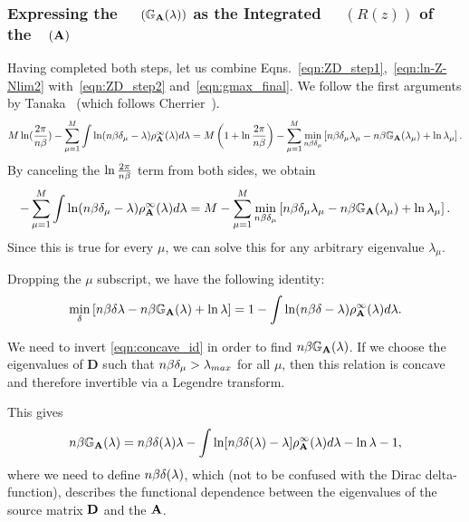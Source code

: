 \subsubsection{Expressing the~\GEN~
\texorpdfstring{$(\mathbb{G}_{\mathbf{A}}(\lambda))$}{GA(lambda)} as the Integrated~\RTransform~
\texorpdfstring{$(R(z))$}{R(z)} of the~\CorrelationMatrix~\texorpdfstring{$(\mathbf{A})$}{A}}
\label{sxn:tanaka_step3}
Having completed both steps, let us combine Eqns.~\ref{eqn:ZD_step1},~\ref{eqn:ln-Z-Nlim2}
with~\ref{eqn:ZD_step2} and~\ref{eqn:gmax_final}.
We follow the first arguments by Tanaka~\cite{Tanaka2007} (which follows Cherrier~\cite{Cherrier2003}).
\begin{align}
   M\ln(\dfrac{{2}\pi}{n\beta})-\sum_{\mu=1}^{M}\int \ln(n\beta\delta_{\mu}-\lambda)\rho^{\infty}_{\mathbf{A}}(\lambda)d\lambda
      = M \left( 1 + \ln \frac{2\pi}{n\beta} \right) - \sum_{\mu=1}^{M} \min_{n\beta\delta_{\mu}} \left[n\beta\delta_{\mu}\lambda_{\mu}
      - n\beta\mathbb{G}_{\mathbf{A}}(\lambda_{\mu}) + \ln \lambda_{\mu} \right]   .
\end{align}
By canceling the $\ln \frac{2\pi}{n\beta}$ term from both sides, we obtain
\begin{align}
   -\sum_{\mu=1}^{M}\int \ln(n\beta\delta_{\mu}-\lambda)\rho^{\infty}_{\mathbf{A}}(\lambda)d\lambda
   =
   M - \sum_{\mu=1}^{M} \min_{n\beta\delta_{\mu}} \left[n\beta\delta_{\mu}\lambda_{\mu}
   - n\beta\mathbb{G}_{\mathbf{A}}(\lambda_{\mu}) + \ln \lambda_{\mu} \right]   .
\end{align}
Since this is true for every $\mu$, we can solve this for any arbitrary eigenvalue $\lambda_{\mu}$.

Dropping the $\mu$ subscript, we have the following identity:
\begin{align}
\label{eqn:concave_id} 
 \min_{\delta} \left[n\beta\delta\lambda - n\beta\mathbb{G}_{\mathbf{A}}(\lambda) + \ln \lambda \right]
 = 1 -\int \ln(n\beta\delta-\lambda)\rho^{\infty}_{\mathbf{A}}(\lambda)d\lambda   .
\end{align}

We need to invert \ref{eqn:concave_id} in order to find $n\beta\mathbb{G}_{\mathbf{A}}(\lambda)$.
If we choose the eigenvalues of $\mathbf{D}$ such that $n\beta\delta_{\mu}>\lambda_{max}$ for all $\mu$, then 
this relation is concave and therefore invertible via a Legendre transform.  

This gives
\begin{equation}
n\beta\mathbb{G}_{\mathbf{A}}(\lambda) = n\beta\delta(\lambda) \lambda - \int \ln[n\beta\delta(\lambda) - \lambda] \rho^{\infty}_{\mathbf{A}}(\lambda) d\lambda - \ln \lambda - 1  ,
\end{equation}
where we need to  define  $ n\beta\delta(\lambda)$, which (not to be confused with the Dirac delta-function), describes
the functional dependence between the eigenvalues of the source matrix $\mathbf{D}$ and the \Student \CorrelationMatrix $\mathbf{A}$.


